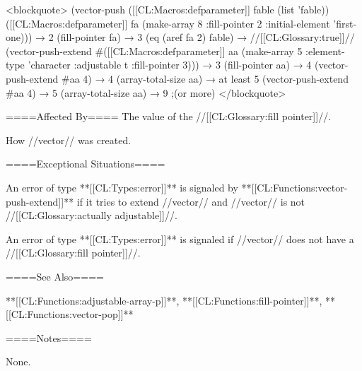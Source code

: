 <blockquote> (vector-push ([[CL:Macros:defparameter]] fable (list 'fable)) ([[CL:Macros:defparameter]] fa (make-array 8 :fill-pointer 2 :initial-element 'first-one))) → 2 (fill-pointer fa) → 3 (eq (aref fa 2) fable) → //[[CL:Glossary:true]]// (vector-push-extend #\X ([[CL:Macros:defparameter]] aa (make-array 5 :element-type 'character :adjustable t :fill-pointer 3))) → 3 (fill-pointer aa) → 4 (vector-push-extend #\Y aa 4) → 4 (array-total-size aa) → at least 5 (vector-push-extend #\Z aa 4) → 5 (array-total-size aa) → 9 ;(or more) </blockquote>

====Affected By==== The value of the //[[CL:Glossary:fill pointer]]//.

How //vector// was created.

====Exceptional Situations====

An error of type **[[CL:Types:error]]** is signaled by **[[CL:Functions:vector-push-extend]]** if it tries to extend //vector// and //vector// is not //[[CL:Glossary:actually adjustable]]//.

An error of type **[[CL:Types:error]]** is signaled if //vector// does not have a //[[CL:Glossary:fill pointer]]//.

====See Also====

**[[CL:Functions:adjustable-array-p]]**, **[[CL:Functions:fill-pointer]]**, **[[CL:Functions:vector-pop]]**

====Notes====

None.


